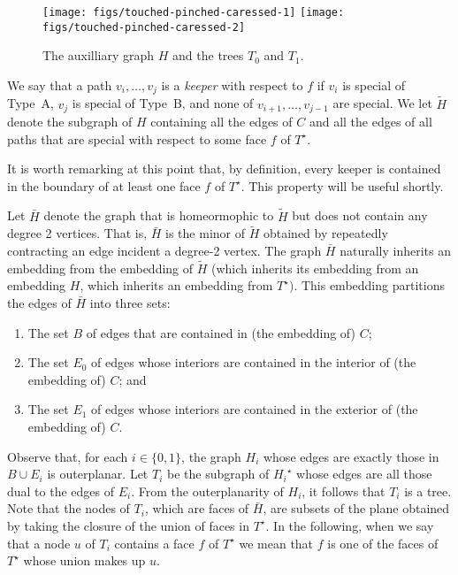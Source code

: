 \documentclass{patmorin}
\newcommand{\dual}[1]{{#1}^\star}
\begin{document}
  \begin{figure}
     \begin{center}
		\texttt{[image: figs/touched-pinched-caressed-1]} 
		\texttt{[image: figs/touched-pinched-caressed-2]}
     \end{center}
	  \caption{The auxilliary graph $H$ and the trees $T_0$ and $T_1$.}
  \end{figure}


We say that a path $v_i,\ldots,v_j$ is a \emph{keeper} with respect to
$f$ if $v_i$ is special of Type~A, $v_j$ is special of Type~B, and none
of $v_{i+1},\ldots,v_{j-1}$ are special.  We let $\tilde{H}$ denote the
subgraph of $H$ containing all the edges of $C$ and all the edges of
all paths that are special with respect to some face $f$ of $\dual{T}$.

It is worth remarking at this point that, by definition, every keeper
is contained in the boundary of at least one face $f$ of $\dual{T}$.
This property will be useful shortly.

Let $\bar{H}$ denote the graph that is homeormophic to $\tilde{H}$ but does not
contain any degree 2 vertices.  That is, $\bar{H}$ is the minor of $\tilde{H}$
obtained by repeatedly contracting an edge incident a degree-2 vertex.
The graph $\bar{H}$ naturally inherits an embedding from the embedding of $\tilde{H}$ (which inherits its embedding from an embedding $H$, which inherits an embedding from $\dual{T})$.  This embedding partitions the edges of $\bar{H}$ into three sets:
\begin{enumerate}
  \item The set $B$ of edges that are contained in (the embedding of) $C$;
  \item The set $E_0$ of edges whose interiors are contained in the interior of (the embedding of) $C$; and
  \item The set $E_1$ of edges whose interiors are contained in the exterior of (the embedding of) $C$.
\end{enumerate}

Observe that, for each $i\in\{0,1\}$, the graph $H_i$ whose edges are
exactly those in $B\cup E_i$ is outerplanar.  Let $T_i$ be the subgraph of
$\dual{H_i}$ whose edges are all those dual to the edges of $E_i$. From
the outerplanarity of $H_i$, it follows that $T_i$ is a tree. Note that
the nodes of $T_i$, which are faces of $\bar{H}$, are subsets of the
plane obtained by taking the closure of the union of faces in $\dual{T}$.
In the following, when we say that a node $u$ of $T_i$ contains a face
$f$ of $\dual{T}$ we mean that $f$ is one of the faces of $\dual{T}$
whose union makes up $u$.
\end{document}
